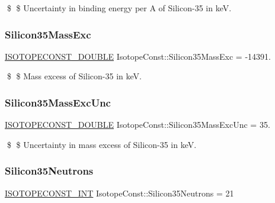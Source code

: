 \$ \$ Uncertainty in binding energy per A of Silicon-\/35 in keV. \mbox{\label{group___isotope_const-_silicon-_si35_gabfc68e011ca59180c107fbdbc9facad6}} 
\subsubsection{\texorpdfstring{Silicon35\+Mass\+Exc}{Silicon35MassExc}}
{\footnotesize\ttfamily \mbox{\hyperlink{group___isotope_const-_macros_ga8f45a7272ce02c0b4c65c44636ed719a}{I\+S\+O\+T\+O\+P\+E\+C\+O\+N\+S\+T\+\_\+\+D\+O\+U\+B\+LE}} Isotope\+Const\+::\+Silicon35\+Mass\+Exc = -\/14391.}

\$ \$ Mass excess of Silicon-\/35 in keV. \mbox{\label{group___isotope_const-_silicon-_si35_ga707d57a4e7444ca43632dd56b3bf46b1}} 
\subsubsection{\texorpdfstring{Silicon35\+Mass\+Exc\+Unc}{Silicon35MassExcUnc}}
{\footnotesize\ttfamily \mbox{\hyperlink{group___isotope_const-_macros_ga8f45a7272ce02c0b4c65c44636ed719a}{I\+S\+O\+T\+O\+P\+E\+C\+O\+N\+S\+T\+\_\+\+D\+O\+U\+B\+LE}} Isotope\+Const\+::\+Silicon35\+Mass\+Exc\+Unc = 35.}

\$ \$ Uncertainty in mass excess of Silicon-\/35 in keV. \mbox{\label{group___isotope_const-_silicon-_si35_ga8fe58f57be539fc51b9f4c8c3039cd09}} 
\subsubsection{\texorpdfstring{Silicon35\+Neutrons}{Silicon35Neutrons}}
{\footnotesize\ttfamily \mbox{\hyperlink{group___isotope_const-_macros_ga5f18360b3e99483a35c32d789e62621c}{I\+S\+O\+T\+O\+P\+E\+C\+O\+N\+S\+T\+\_\+\+I\+NT}} Isotope\+Const\+::\+Silicon35\+Neutrons = 21}

